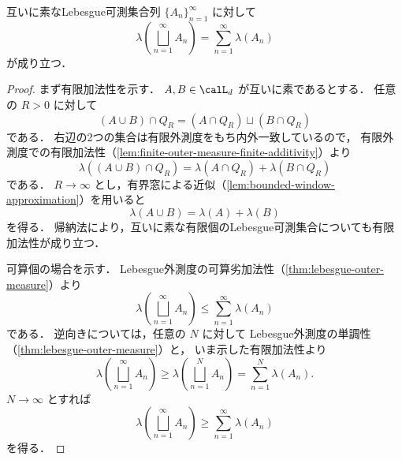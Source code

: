 \begin{theorem}[完全加法性]\label{thm:lebesgue-measure-countable-additivity}
互いに素なLebesgue可測集合列 $\{A_n\}_{n=1}^{\infty}$ に対して
\[
\lambda\left(\bigsqcup_{n=1}^{\infty}A_n\right)
=
\sum_{n=1}^{\infty}\lambda(A_n)
\]
が成り立つ．
\end{theorem}
\begin{proof}
まず有限加法性を示す．
$A,B\in\calL_d$ が互いに素であるとする．
任意の $R>0$ に対して
\[
(A\cup B)\cap Q_R
=
(A\cap Q_R)\sqcup(B\cap Q_R)
\]
である．
右辺の2つの集合は有限外測度をもち内外一致しているので，
有限外測度での有限加法性（\cref{lem:finite-outer-measure-finite-additivity}）より
\[
\lambda((A\cup B)\cap Q_R)
=
\lambda(A\cap Q_R)+\lambda(B\cap Q_R)
\]
である．
$R\to\infty$ とし，有界窓による近似（\cref{lem:bounded-window-approximation}）を用いると
\[
\lambda(A\cup B)=\lambda(A)+\lambda(B)
\]
を得る．
帰納法により，互いに素な有限個のLebesgue可測集合についても有限加法性が成り立つ．

可算個の場合を示す．
Lebesgue外測度の可算劣加法性（\cref{thm:lebesgue-outer-measure}）より
\[
\lambda\left(\bigsqcup_{n=1}^{\infty}A_n\right)
\le
\sum_{n=1}^{\infty}\lambda(A_n)
\]
である．
逆向きについては，任意の $N$ に対して
Lebesgue外測度の単調性（\cref{thm:lebesgue-outer-measure}）と，
いま示した有限加法性より
\[
\lambda\left(\bigsqcup_{n=1}^{\infty}A_n\right)
\ge
\lambda\left(\bigsqcup_{n=1}^{N}A_n\right)
=
\sum_{n=1}^{N}\lambda(A_n).
\]
$N\to\infty$ とすれば
\[
\lambda\left(\bigsqcup_{n=1}^{\infty}A_n\right)
\ge
\sum_{n=1}^{\infty}\lambda(A_n)
\]
を得る．
\end{proof}

